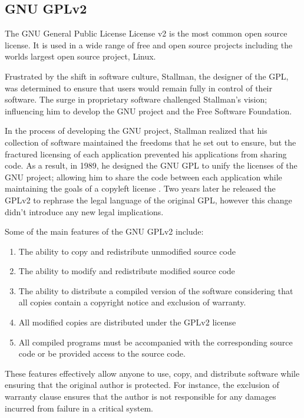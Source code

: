 \documentclass[12pt,letterpaper]{article}
\begin{document}
\subsection{GNU GPLv2}

The GNU General Public License License v2 is the most common open source license. It is used in a wide range of free and open source projects including the worlds largest open source project, Linux.

Frustrated by the shift in software culture, Stallman, the designer of the GPL, was determined to ensure that users would remain fully in control of their software. The surge in proprietary software challenged Stallman's vision; influencing him to develop the GNU project and the Free Software Foundation.

In the process of developing the GNU project, Stallman realized that his collection of software maintained the freedoms that he set out to ensure, but the fractured licensing of each application prevented his applications from sharing code. As a result, in 1989, he designed the GNU GPL to unify the licenses of the GNU project; allowing him to share the code between each application while maintaining the goals of a copyleft license \cite{gpl2}. Two years later he released the GPLv2 to rephrase the legal language of the original GPL, however this change didn't introduce any new legal implications.

Some of the main features of the GNU GPLv2 include:
\begin{enumerate}
\item The ability to copy and redistribute unmodified source code
\item The ability to modify and redistribute modified source code
\item The ability to distribute a compiled version of the software considering that all copies contain a copyright notice and exclusion of warranty.
\item All modified copies are distributed under the GPLv2 license
\item All compiled programs must be accompanied with the corresponding source code or be provided access to the source code.
\end{enumerate}

\cite{gpl2}

These features effectively allow anyone to use, copy, and distribute software while ensuring that the original author is protected. For instance, the exclusion of warranty clause ensures that the author is not responsible for any damages incurred from failure in a critical system.
\end{document}
